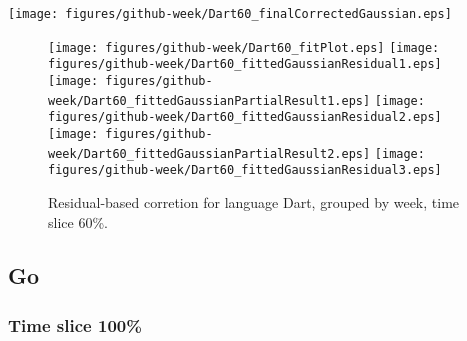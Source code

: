 \begin{center}
{\texttt{[image: figures/github-week/Dart60\_finalCorrectedGaussian.eps]}}
\end{center}

\FloatBarrier

\begin{figure}[t]
\centering
{}
{\texttt{[image: figures/github-week/Dart60\_fitPlot.eps]}}
{\texttt{[image: figures/github-week/Dart60\_fittedGaussianResidual1.eps]}}
{\texttt{[image: figures/github-week/Dart60\_fittedGaussianPartialResult1.eps]}}
{\texttt{[image: figures/github-week/Dart60\_fittedGaussianResidual2.eps]}}
{\texttt{[image: figures/github-week/Dart60\_fittedGaussianPartialResult2.eps]}}
{\texttt{[image: figures/github-week/Dart60\_fittedGaussianResidual3.eps]}}
\caption{Residual-based corretion for language Dart, grouped by week, time slice 60\%.}
\end{figure}


\FloatBarrier


\subsection{Go}

\subsubsection{Time slice 100\%}

